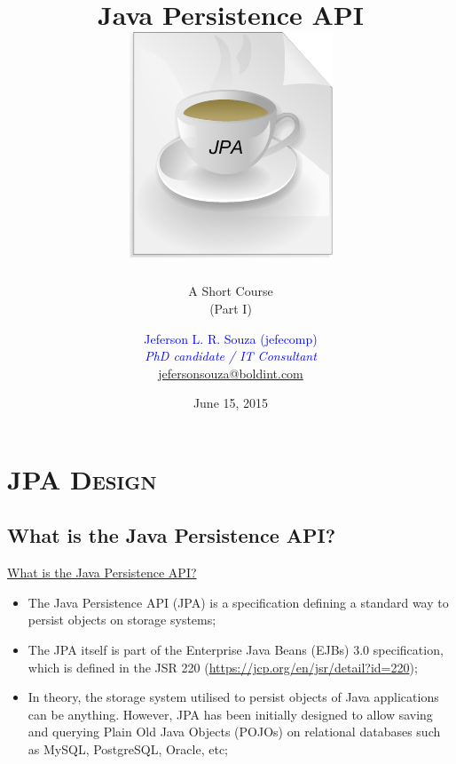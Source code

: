 \documentclass[xcolor=x11names,compress]{beamer}
\renewcommand{\(}{\begin{columns}}
\renewcommand{\)}{\end{columns}}
\newcommand{\<}[1]{\begin{column}{#1}}
\renewcommand{\>}{\end{column}}
\begin{document}
\title{Java Persistence API \\[4mm]
\includegraphics[keepaspectratio,width=.3\textwidth]{JPA}}
\subtitle{A Short Course \\ (Part I) \vspace*{-4mm}}
\author[Jeferson L. R. Souza (jefecomp) - All rights reserved.]{
	\textcolor{blue}{Jeferson L. R. Souza (jefecomp)} \\[1mm] 
	\textcolor{blue}{\textit{{\footnotesize PhD candidate / IT Consultant}}}\\[1.5mm]
	 \underline{{\footnotesize jefersonsouza@boldint.com}}
	 \vspace*{-6mm}
}
\date{{\footnotesize June 15, 2015}}


\begin{frame}
\titlepage
\end{frame}

\section{\scshape JPA Design}
\subsection{What is the Java Persistence API?}
\begin{frame}{\underline{What is the Java Persistence API?}}
\begin{itemize}
\itemsep 12pt
\justifying
\item The Java Persistence API (JPA) is a specification defining a standard way to persist objects on storage systems;

\item The JPA itself is part of the Enterprise Java Beans (EJBs) 3.0 specification, which is defined in the JSR 220 (\url{https://jcp.org/en/jsr/detail?id=220});

\item In theory, the storage system utilised to persist objects of Java applications can be anything. However, JPA has been initially designed to allow saving and querying Plain Old Java Objects (POJOs) on relational databases such as MySQL, PostgreSQL, Oracle, etc;

\end{itemize}
\end{frame}
\end{document}
